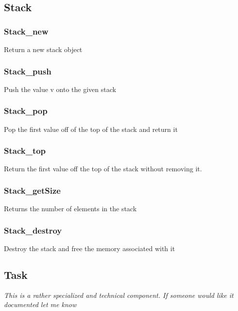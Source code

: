 \subsection{Stack} \label{apistack}
\subsubsection{Stack\_new} \label{apistacknew}
 Return a new stack object

\subsubsection{Stack\_push} \label{apistackpush}
 Push the value v onto the given
stack

\subsubsection{Stack\_pop} \label{apistackpop}
 Pop the first value off of the top of the
stack and return it

\subsubsection{Stack\_top} \label{apistacktop}
 Return the first value off the top of the
stack without removing it.

\subsubsection{Stack\_getSize} \label{apistacksize}
 Returns the number of elements in the
stack

\subsubsection{Stack\_destroy} \label{apistackdestroy}
 Destroy the stack and free the memory
associated with it

\subsection{Task} \label{apitask}
\textit{This is a rather specialized and technical component. If someone would like it documented let me know}
